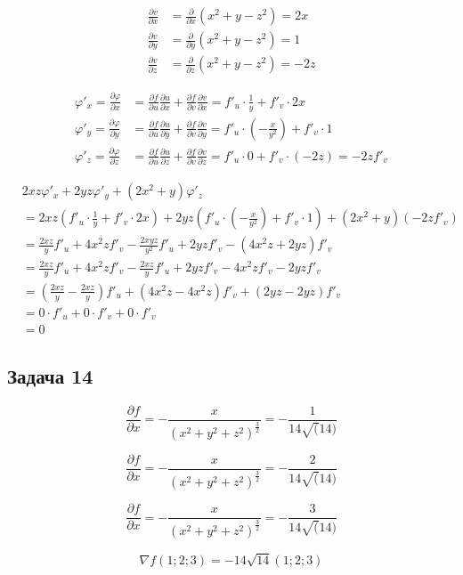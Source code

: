 \documentclass[a4paper,12pt]{article}
\begin{document}
\begin{align*}
\frac{\partial v}{\partial x} &= \frac{\partial}{\partial x} \left(x^2 + y - z^2\right) = 2x \\
\frac{\partial v}{\partial y} &= \frac{\partial}{\partial y} \left(x^2 + y - z^2\right) = 1 \\
\frac{\partial v}{\partial z} &= \frac{\partial}{\partial z} \left(x^2 + y - z^2\right) = -2z
\end{align*}


\begin{align*}
\varphi'_x = \frac{\partial \varphi}{\partial x} &= \frac{\partial f}{\partial u} \frac{\partial u}{\partial x} + \frac{\partial f}{\partial v} \frac{\partial v}{\partial x} = f'_u \cdot \frac{1}{y} + f'_v \cdot 2x \\
\varphi'_y = \frac{\partial \varphi}{\partial y} &= \frac{\partial f}{\partial u} \frac{\partial u}{\partial y} + \frac{\partial f}{\partial v} \frac{\partial v}{\partial y} = f'_u \cdot \left(-\frac{x}{y^2}\right) + f'_v \cdot 1 \\
\varphi'_z = \frac{\partial \varphi}{\partial z} &= \frac{\partial f}{\partial u} \frac{\partial u}{\partial z} + \frac{\partial f}{\partial v} \frac{\partial v}{\partial z} = f'_u \cdot 0 + f'_v \cdot (-2z) = -2z f'_v
\end{align*}


\begin{align*}
&2xz\varphi'_x + 2yz\varphi'_y + (2x^2 + y)\varphi'_z \\
&= 2xz \left(f'_u \cdot \frac{1}{y} + f'_v \cdot 2x\right) + 2yz \left(f'_u \cdot \left(-\frac{x}{y^2}\right) + f'_v \cdot 1\right) + (2x^2 + y) \left(-2z f'_v\right) \\
&= \frac{2xz}{y} f'_u + 4x^2z f'_v - \frac{2xyz}{y^2} f'_u + 2yz f'_v - (4x^2z + 2yz) f'_v \\
&= \frac{2xz}{y} f'_u + 4x^2z f'_v - \frac{2xz}{y} f'_u + 2yz f'_v - 4x^2z f'_v - 2yz f'_v \\
&= \left(\frac{2xz}{y} - \frac{2xz}{y}\right) f'_u + \left(4x^2z - 4x^2z\right) f'_v + \left(2yz - 2yz\right) f'_v \\
&= 0 \cdot f'_u + 0 \cdot f'_v + 0 \cdot f'_v \\
&= 0
\end{align*}

\subsection{Задача 14}
\[
\frac{\partial f}{\partial x} = -\frac{x}{(x^2+y^2+z^2)^{\frac{3}{2}}} = -\frac{1}{14\sqrt(14)}
\]

\[
\frac{\partial f}{\partial x} = -\frac{x}{(x^2+y^2+z^2)^{\frac{3}{2}}} = -\frac{2}{14\sqrt(14)}
\]

\[
\frac{\partial f}{\partial x} = -\frac{x}{(x^2+y^2+z^2)^{\frac{3}{2}}} = -\frac{3}{14\sqrt(14)}
\]

\[
\nabla f(1;2;3) = -14\sqrt{14} (1;2;3)
\]
\end{document}

